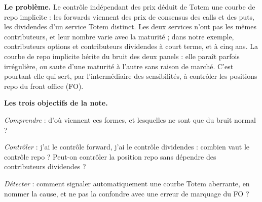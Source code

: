 \begin{bref}
\textbf{Le problème.} Le contrôle indépendant des prix déduit de Totem une courbe de repo implicite : les forwards
viennent des prix de consensus des calls et des puts, les dividendes d'un service Totem distinct. Les deux services
n'ont pas les mêmes contributeurs, et leur nombre varie avec la maturité ; dans notre exemple, \vRunNoptShort{}
contributeurs options et \vRunNdivShort{} contributeurs dividendes à court terme, \vRunNoptLong{} et \vRunNdivLong{} à
cinq ans. La courbe de repo implicite hérite du bruit des deux panels : elle paraît parfois irrégulière, ou saute
d'une maturité à l'autre sans raison de marché. C'est pourtant elle qui sert, par l'intermédiaire des
sensibilités, à contrôler les positions repo du front office (FO).

\medskip
\textbf{Les trois objectifs de la note.}
\begin{description}[leftmargin=1.1cm,labelwidth=0.9cm,labelsep=0.2cm,itemsep=1pt]
\item[O1] \emph{Comprendre} : d'où viennent ces formes, et lesquelles ne sont que du bruit normal ?
\item[O2] \emph{Contrôler} : \og j'ai le contrôle forward, j'ai le contrôle dividendes : combien vaut le contrôle
repo ? \fg{} Peut-on contrôler la position repo sans dépendre des contributeurs dividendes ?
\item[O3] \emph{Détecter} : comment signaler automatiquement une courbe Totem aberrante, en nommer la cause, et ne
pas la confondre avec une erreur de marquage du FO ?
\end{description}


\end{bref}
